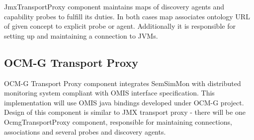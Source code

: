 JmxTransportProxy component maintains maps of discovery agents and capability probes to fulfill its duties. In both cases map associates ontology URL of given concept to explicit probe or agent. Additionally it is responsible for setting up and maintaining a connection to JVMs.

\subsection{OCM-G Transport Proxy}

OCM-G Transport Proxy component integrates SemSimMon with distributed monitoring system compliant with OMIS interface specification. This implementation will use OMIS java bindings developed under OCM-G project. Design of this component is similar to JMX transport proxy - there will be one OcmgTransportProxy component, responsible for maintaining connections, associations and several probes and discovery agents.

